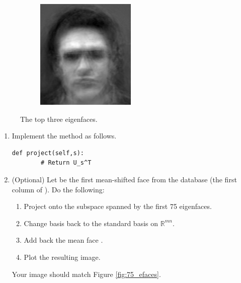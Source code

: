\begin{figure}
\begin{subfigure}[b]{0.3\textwidth}
\end{subfigure}
\begin{subfigure}[b]{0.3\textwidth}
\includegraphics[width=\textwidth]{eigenface2.png}
\end{subfigure}
\caption{The top three eigenfaces.}
\label{facialRecognition:eigenfaces}
\end{figure}



\begin{problem}
\label{prob:top_n}
\leavevmode
\begin{enumerate}
\item Implement the method   as follows.
\begin{lstlisting}
def project(self,s):
        # Return U_s^T
\end{lstlisting}
\item (Optional) Let  be the first mean-shifted face from the database (the first column of ). Do the following:
\begin{enumerate}
\item Project  onto the subspace spanned by the first 75 eigenfaces.
\item Change basis back to the standard basis on $\mathbb{R}^{mn}$.
\item Add back the mean face .
\item Plot the resulting image.
\end{enumerate}
Your image should match Figure \ref{fig:75_efaces}.
\end{enumerate}
\end{problem}


